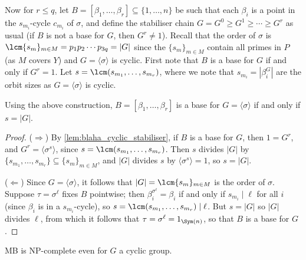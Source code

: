 Now for $r \leq q$, let $B = [\beta_1,\dotsc,\beta_r] \subseteq \{1,\dotsc,n\}$ be such that each $\beta_i$ is a point in the $s_{m_i}$-cycle $c_{m_i}$ of $\sigma$, and define the stabiliser chain $G = G^0 \geq G^1 \geq \dotsb \geq G^r$ as usual (if $B$ is not a base for $G$, then $G^r \neq 1$). Recall that the order of $\sigma$ is $\lcm\{s_m\}_{m \in M} = p_1 p_2 \dotsb p_{3q} = |G|$ since the $\{s_m\}_{m \in M}$ contain all primes in $P$ (as $M$ covers $Y$) and $G = \langle \sigma \rangle$ is cyclic. First note that $B$ is a base for $G$ if and only if $G^r = 1$. Let $s = \lcm(s_{m_1},\dotsc,s_{m_r})$, where we note that $s_{m_i} = |\beta_i^G|$ are the orbit sizes as $G = \langle \sigma \rangle$ is cyclic. 

\begin{lemma}\label{lem:blaha_cyclic_base}
    Using the above construction, $B = [\beta_1,\dotsc,\beta_r]$ is a base for $G = \langle \sigma \rangle$ if and only if $s = |G|$.
\end{lemma}

\begin{proof}
    ($\Longrightarrow$) By \autoref{lem:blaha_cyclic_stabiliser}, if $B$ is a base for $G$, then $1 = G^r$, and $G^r = \langle \sigma^s\rangle$, since $s = \lcm(s_{m_1},\dotsc,s_{m_r})$. Then $s$ divides $|G|$ by $\{s_{m_1},\dotsc,s_{m_r}\} \subseteq \{s_m\}_{m \in M}$, and $|G|$ divides $s$ by $\langle \sigma^s \rangle = 1$, so $s = |G|$.

    ($\Longleftarrow$) Since $G = \langle \sigma \rangle$, it follows that $|G| = \lcm\{s_m\}_{m \in M}$ is the order of $\sigma$. Suppose $\tau = \sigma^\ell$ fixes $B$ pointwise; then $\beta_i^{\sigma^\ell} = \beta_i$ if and only if $s_{m_i} \mid \ell$ for all $i$ (since $\beta_i$ is in a $s_{m_i}$-cycle), so $s = \lcm(s_{m_1},\dotsc,s_{m_r}) \mid \ell$. But $s = |G|$ so $|G|$ divides $\ell$, from which it follows that $\tau = \sigma^\ell = 1_{\Sym(n)}$, so that $B$ is a base for $G$.
\end{proof}


\begin{theorem}\label{thm:blaha_cyclic_NP_complete}
    MB is NP-complete even for $G$ a cyclic group.
\end{theorem}

